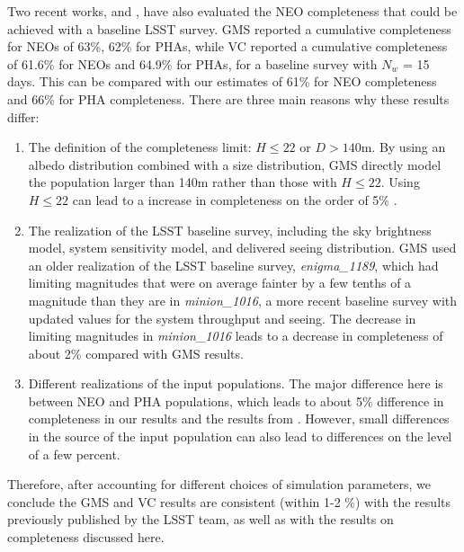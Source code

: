 Two recent works, \citet*[][hereafter GMS]{GMS2016} and \citet*[][hereafter VC]{VeresChesley2017neo}, 
have also evaluated the NEO completeness that could be achieved with a baseline LSST survey.
GMS reported a cumulative completeness for NEOs of 63\%, 62\% for PHAs,
while VC reported a cumulative completeness of 61.6\%  for NEOs and 64.9\% for PHAs, 
for a baseline survey with $N_w$ = 15 days. This can be compared with our estimates of 61\% for NEO completeness
and 66\% for PHA completeness.
There are three main reasons why these results differ:
\begin{enumerate}
\item The definition of the completeness limit: $H\le22$ or $D>140$m. By using an albedo distribution combined 
with a size distribution, GMS directly model the population larger than 140m rather than those with $H\le22$. 
Using $H\le22$ can lead to a increase in completeness on the order of 5\% \citep{2016AJ....152...79W, GMS2016}.
\item The realization of the LSST baseline survey, including the sky brightness model, system sensitivity model, and
delivered seeing distribution.  GMS used an older realization of the LSST baseline survey, {\it enigma\_1189}, which
had limiting magnitudes that were on average fainter by a few tenths of a magnitude than they are in 
{\it minion\_1016}, a more recent baseline survey with updated values for the system throughput and seeing. 
The decrease in limiting magnitudes in {\it minion\_1016} leads to a decrease in completeness of about 2\% compared
with GMS results.
\item Different realizations of the input populations. The major difference here is between NEO and PHA populations,
which leads to about 5\% difference in completeness in our results and the results from \citet{VeresChesley2017neo}.
However, small differences in the source of the input population can also lead to differences on the level of a few percent\citep{VeresChesley2017neo}. 
\end{enumerate}

Therefore, after accounting for different choices of simulation parameters, 
we conclude the GMS and VC results are consistent (within 1-2 \%)
with the results previously published by the LSST team, as well as with the results on completeness discussed here.
